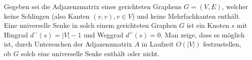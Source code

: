 
\begin{exercise}

Gegeben sei die Adjazenzmatrix eines gerichteten Graphens $G = (V,E)$, welcher keine Schlingen (also Kanten $(v,v), v \in V$) und keine Mehrfachkanten enthält.
Eine universelle Senke in solch einem gerichteten Graphen $G$ ist ein Knoten $s$ mit Hingrad $d^-(s) = |V| - 1$ und Weggrad $d^+(s) = 0$.
Man zeige, dass es möglich ist, durch Untersuchen der Adjazenzmatrix $A$ in Laufzeit $O(|V|)$ festzustellen, ob $G$ solch eine universelle Senke enthält oder nicht.

\end{exercise}


